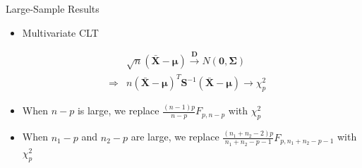\documentclass[
  ignorenonframetext,
]{beamer}
\providecommand{\tightlist}{%
  \setlength{\itemsep}{0pt}\setlength{\parskip}{0pt}}
\begin{document}
\begin{frame}{Large-Sample Results}
\protect\hypertarget{large-sample-results}{}
\begin{itemize}
\tightlist
\item
  Multivariate CLT
\end{itemize}

\[\begin{aligned}
& & \sqrt{n} (\bar{\mathbf X} -\boldsymbol \mu ) \overset{\mathbf D} \rightarrow N(\mathbf 0, \boldsymbol \Sigma)\\
& \Rightarrow & n(\bar{\mathbf X}-\boldsymbol \mu)^T \mathbf S^{-1}(\bar{\mathbf X}-\boldsymbol \mu) \rightarrow \chi_p^2
\end{aligned}
\]

\begin{itemize}
\tightlist
\item
  When \(n-p\) is large, we replace \(\frac{(n-1)p}{n-p}F_{p, n-p}\)
  with \(\chi_{p}^2\)
\item
  When \(n_1-p\) and \(n_2-p\) are large, we replace
  \(\frac{(n_1+n_2-2)p}{n_1+n_2-p-1}F_{p, n_1+n_2-p-1}\) with
  \(\chi_{p}^2\)
\end{itemize}
\end{frame}
\end{document}
